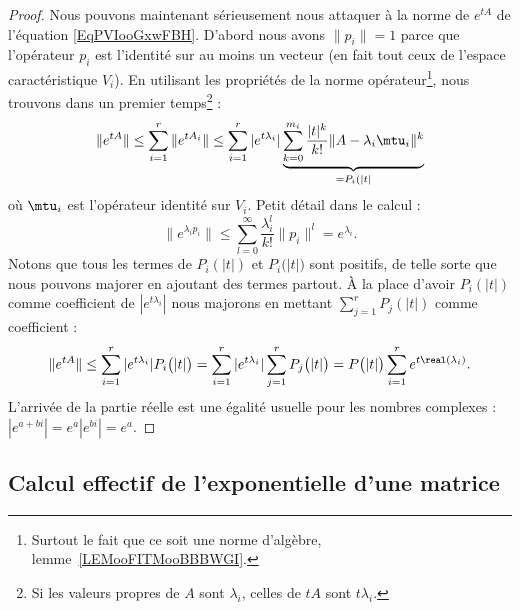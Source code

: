 \begin{proof}
    Nous pouvons maintenant sérieusement nous attaquer à la norme de \(  e^{tA}\) de l'équation \eqref{EqPVIooGxwFBH}. D'abord nous avons \( \| p_i \|=1\) parce que l'opérateur \( p_i\) est l'identité sur au moins un vecteur (en fait tout ceux de l'espace caractéristique \( V_i\)). En utilisant les propriétés de la norme opérateur\footnote{Surtout le fait que ce soit une norme d'algèbre, lemme~\ref{LEMooFITMooBBBWGI}.}, nous trouvons dans un premier temps\footnote{Si les valeurs propres de \( A\) sont \( \lambda_i\), celles de \( tA\) sont \( t\lambda_i\).} :
    \begin{equation}
        \|  e^{tA} \|\leq \sum_{i=1}^r\|  e^{tA_i} \|\leq \sum_{i=1}^r|  e^{t\lambda_i} |\underbrace{\sum_{k=0}^{m_i}\frac{ | t |^k }{ k! }\| A-\lambda_i\mtu_i \|^k}_{=P_i( | t | }
    \end{equation}
    où \( \mtu_i\) est l'opérateur identité sur \( V_i\). Petit détail dans le calcul :
    \begin{equation}
        \|  e^{\lambda_ip_i} \|\leq \sum_{l=0}^{\infty}\frac{ \lambda_i^l }{ k! }\| p_i \|^l= e^{\lambda_i}.
    \end{equation}
    Notons que tous les termes de \( P_i(| t |)\) et \( P_i\big( | t | \big)\) sont positifs, de telle sorte que nous pouvons majorer en ajoutant des termes partout. À la place d'avoir \( P_i(| t |)\) comme coefficient de \( |  e^{t\lambda_i} |\) nous majorons en mettant \( \sum_{j=1}^rP_j(| t |)\) comme coefficient :
    \begin{equation}
        \|  e^{tA} \|\leq    \sum_{i=1}^r|  e^{t\lambda_i} |P_i\big( | t | \big)
        =\sum_{i=1}^r|  e^{t\lambda_i} |\sum_{j=1}^rP_j\big( | t | \big)=P\big( | t | \big)\sum_{i=1}^r e^{t\real(\lambda_i)}.
    \end{equation}
    L'arrivée de la partie réelle est une égalité usuelle pour les nombres complexes : $|  e^{a+bi} |= e^{a}|  e^{bi} |= e^{a}$.
\end{proof}

\subsection{Calcul effectif de l'exponentielle d'une matrice}
\label{SUBSECooGAHVooBRUFub}

